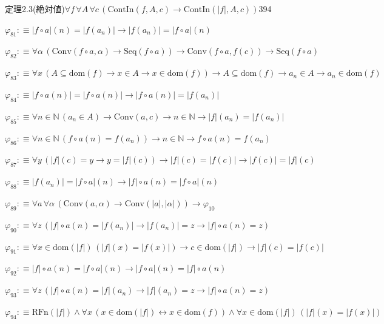 \begin{fullproof}{定理2.3(絶対値)}{$\forall f\,\forall A\,\forall c\,(\mathrm{ContIn}(f,A,c) \to \mathrm{ContIn}(\lvert f \rvert,A,c))$}{394}
\begin{abbrevlist}
\item $\varphi_{81} :\equiv \lvert f \circ a \rvert(n) = \lvert f(a_{n}) \rvert \to \lvert f(a_{n}) \rvert = \lvert f \circ a \rvert(n)$
\item $\varphi_{82} :\equiv \forall \alpha\,(\mathrm{Conv}(f \circ a,\alpha) \to \mathrm{Seq}(f \circ a)) \to \mathrm{Conv}(f \circ a,f(c)) \to \mathrm{Seq}(f \circ a)$
\item $\varphi_{83} :\equiv \forall x\,(A \subseteq \mathrm{dom}(f) \to x \in A \to x \in \mathrm{dom}(f)) \to A \subseteq \mathrm{dom}(f) \to a_{n} \in A \to a_{n} \in \mathrm{dom}(f)$
\item $\varphi_{84} :\equiv \lvert f \circ a(n) \rvert = \lvert f \circ a(n) \rvert \to \lvert f \circ a(n) \rvert = \lvert f(a_{n}) \rvert$
\item $\varphi_{85} :\equiv \forall n \in \mathbb{N}\,(a_{n} \in A) \to \mathrm{Conv}(a,c) \to n \in \mathbb{N} \to \lvert f \rvert(a_{n}) = \lvert f(a_{n}) \rvert$
\item $\varphi_{86} :\equiv \forall n \in \mathbb{N}\,(f \circ a(n) = f(a_{n})) \to n \in \mathbb{N} \to f \circ a(n) = f(a_{n})$
\item $\varphi_{87} :\equiv \forall y\,(\lvert f \rvert(c) = y \to y = \lvert f \rvert(c)) \to \lvert f \rvert(c) = \lvert f(c) \rvert \to \lvert f(c) \rvert = \lvert f \rvert(c)$
\item $\varphi_{88} :\equiv \lvert f(a_{n}) \rvert = \lvert f \circ a \rvert(n) \to \lvert f \rvert \circ a(n) = \lvert f \circ a \rvert(n)$
\item $\varphi_{89} :\equiv \forall a\,\forall \alpha\,(\mathrm{Conv}(a,\alpha) \to \mathrm{Conv}(\lvert a \rvert,\lvert \alpha \rvert)) \to \varphi_{10}$
\item $\varphi_{90} :\equiv \forall z\,(\lvert f \rvert \circ a(n) = \lvert f(a_{n}) \rvert \to \lvert f(a_{n}) \rvert = z \to \lvert f \rvert \circ a(n) = z)$
\item $\varphi_{91} :\equiv \forall x \in \mathrm{dom}(\lvert f \rvert)\,(\lvert f \rvert(x) = \lvert f(x) \rvert) \to c \in \mathrm{dom}(\lvert f \rvert) \to \lvert f \rvert(c) = \lvert f(c) \rvert$
\item $\varphi_{92} :\equiv \lvert f \rvert \circ a(n) = \lvert f \circ a \rvert(n) \to \lvert f \circ a \rvert(n) = \lvert f \rvert \circ a(n)$
\item $\varphi_{93} :\equiv \forall z\,(\lvert f \rvert \circ a(n) = \lvert f \rvert(a_{n}) \to \lvert f \rvert(a_{n}) = z \to \lvert f \rvert \circ a(n) = z)$
\item $\varphi_{94} :\equiv \mathrm{RFn}(\lvert f \rvert) \land \forall x\,(x \in \mathrm{dom}(\lvert f \rvert) \leftrightarrow x \in \mathrm{dom}(f)) \land \forall x \in \mathrm{dom}(\lvert f \rvert)\,(\lvert f \rvert(x) = \lvert f(x) \rvert)$

\end{abbrevlist}
\end{fullproof}
